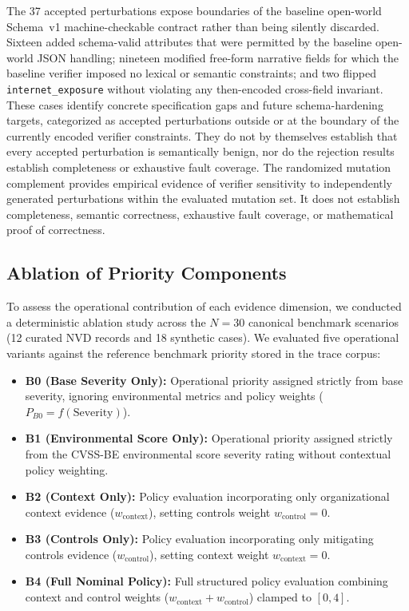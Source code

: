 \documentclass[conference]{IEEEtran}
\begin{document}
The 37 accepted perturbations expose boundaries of the baseline open-world Schema~v1 machine-checkable contract rather than being silently discarded. Sixteen added schema-valid attributes that were permitted by the baseline open-world JSON handling; nineteen modified free-form narrative fields for which the baseline verifier imposed no lexical or semantic constraints; and two flipped \texttt{internet\_exposure} without violating any then-encoded cross-field invariant. These cases identify concrete specification gaps and future schema-hardening targets, categorized as accepted perturbations outside or at the boundary of the currently encoded verifier constraints. They do not by themselves establish that every accepted perturbation is semantically benign, nor do the rejection results establish completeness or exhaustive fault coverage. The randomized mutation complement provides empirical evidence of verifier sensitivity to independently generated perturbations within the evaluated mutation set. It does not establish completeness, semantic correctness, exhaustive fault coverage, or mathematical proof of correctness.

\subsection{Ablation of Priority Components}

To assess the operational contribution of each evidence dimension, we conducted a deterministic ablation study across the $N=30$ canonical benchmark scenarios (12 curated NVD records and 18 synthetic cases). We evaluated five operational variants against the reference benchmark priority stored in the trace corpus:
\begin{itemize}
    \item \textbf{B0 (Base Severity Only):} Operational priority assigned strictly from base severity, ignoring environmental metrics and policy weights ($P_{B0} = f(\text{Severity})$).
    \item \textbf{B1 (Environmental Score Only):} Operational priority assigned strictly from the CVSS-BE environmental score severity rating without contextual policy weighting.
    \item \textbf{B2 (Context Only):} Policy evaluation incorporating only organizational context evidence ($w_{\text{context}}$), setting controls weight $w_{\text{control}} = 0$.
    \item \textbf{B3 (Controls Only):} Policy evaluation incorporating only mitigating controls evidence ($w_{\text{control}}$), setting context weight $w_{\text{context}} = 0$.
    \item \textbf{B4 (Full Nominal Policy):} Full structured policy evaluation combining context and control weights ($w_{\text{context}} + w_{\text{control}}$) clamped to $[0, 4]$.
\end{itemize}
\end{document}
